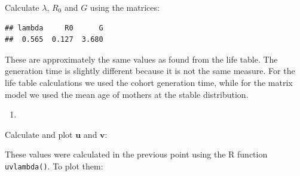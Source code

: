 \documentclass[
]{book}
\newenvironment{Shaded}{\begin{snugshade}}{\end{snugshade}}
\newcommand{\DecValTok}[1]{\textcolor[rgb]{0.00,0.00,0.81}{#1}}
\newcommand{\FunctionTok}[1]{\textcolor[rgb]{0.00,0.00,0.00}{#1}}
\newcommand{\NormalTok}[1]{#1}
\newcommand{\OtherTok}[1]{\textcolor[rgb]{0.56,0.35,0.01}{#1}}
\newcommand{\SpecialCharTok}[1]{\textcolor[rgb]{0.00,0.00,0.00}{#1}}
\newcommand{\StringTok}[1]{\textcolor[rgb]{0.31,0.60,0.02}{#1}}
\providecommand{\tightlist}{%
  \setlength{\itemsep}{0pt}\setlength{\parskip}{0pt}}
\begin{document}
Calculate \(\lambda\), \(R_0\) and \(G\) using the matrices:

\begin{Shaded}
\end{Shaded}

\begin{verbatim}
## lambda     R0      G 
##  0.565  0.127  3.680
\end{verbatim}

These are approximately the same values as found from the life table. The generation time is slightly different because it is not the same measure. For the life table calculations we used the cohort generation time, while for the matrix model we used the mean age of mothers at the stable distribution.

\begin{enumerate}
\def\labelenumi{\arabic{enumi}.}
\setcounter{enumi}{5}
\tightlist
\item
\end{enumerate}

Calculate and plot \(\mathbf{u}\) and \(\mathbf{v}\):

These values were calculated in the previous point using the R function \texttt{uvlambda()}. To plot them:
\end{document}
